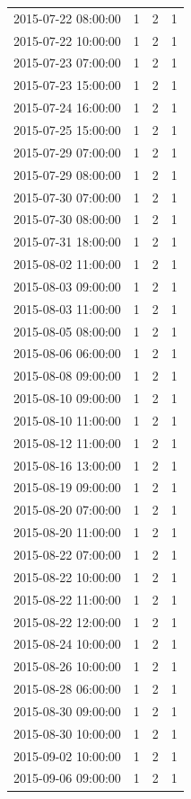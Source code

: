 \begin{tabular}{lrrr}
2015-07-22 08:00:00 & 1 & 2 & 1 \\
2015-07-22 10:00:00 & 1 & 2 & 1 \\
2015-07-23 07:00:00 & 1 & 2 & 1 \\
2015-07-23 15:00:00 & 1 & 2 & 1 \\
2015-07-24 16:00:00 & 1 & 2 & 1 \\
2015-07-25 15:00:00 & 1 & 2 & 1 \\
2015-07-29 07:00:00 & 1 & 2 & 1 \\
2015-07-29 08:00:00 & 1 & 2 & 1 \\
2015-07-30 07:00:00 & 1 & 2 & 1 \\
2015-07-30 08:00:00 & 1 & 2 & 1 \\
2015-07-31 18:00:00 & 1 & 2 & 1 \\
2015-08-02 11:00:00 & 1 & 2 & 1 \\
2015-08-03 09:00:00 & 1 & 2 & 1 \\
2015-08-03 11:00:00 & 1 & 2 & 1 \\
2015-08-05 08:00:00 & 1 & 2 & 1 \\
2015-08-06 06:00:00 & 1 & 2 & 1 \\
2015-08-08 09:00:00 & 1 & 2 & 1 \\
2015-08-10 09:00:00 & 1 & 2 & 1 \\
2015-08-10 11:00:00 & 1 & 2 & 1 \\
2015-08-12 11:00:00 & 1 & 2 & 1 \\
2015-08-16 13:00:00 & 1 & 2 & 1 \\
2015-08-19 09:00:00 & 1 & 2 & 1 \\
2015-08-20 07:00:00 & 1 & 2 & 1 \\
2015-08-20 11:00:00 & 1 & 2 & 1 \\
2015-08-22 07:00:00 & 1 & 2 & 1 \\
2015-08-22 10:00:00 & 1 & 2 & 1 \\
2015-08-22 11:00:00 & 1 & 2 & 1 \\
2015-08-22 12:00:00 & 1 & 2 & 1 \\
2015-08-24 10:00:00 & 1 & 2 & 1 \\
2015-08-26 10:00:00 & 1 & 2 & 1 \\
2015-08-28 06:00:00 & 1 & 2 & 1 \\
2015-08-30 09:00:00 & 1 & 2 & 1 \\
2015-08-30 10:00:00 & 1 & 2 & 1 \\
2015-09-02 10:00:00 & 1 & 2 & 1 \\
2015-09-06 09:00:00 & 1 & 2 & 1 \\

\end{tabular}
